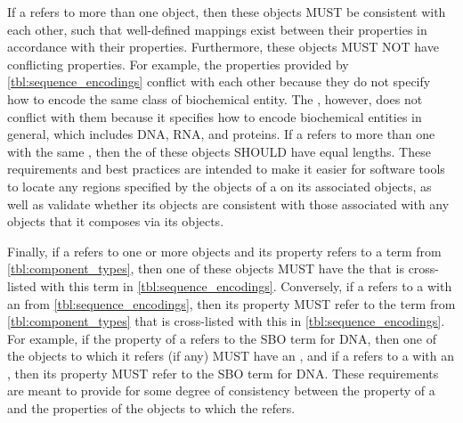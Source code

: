 If a  refers to more than one  object, then these objects MUST be consistent with each other, such that well-defined mappings exist between their  properties in accordance with their  properties. Furthermore, these objects MUST NOT have conflicting  properties. For example, the   properties provided by \ref{tbl:sequence_encodings} conflict with each other because they do not specify how to encode the same class of biochemical entity. The  , however, does not conflict with them because it specifies how to encode biochemical entities in general, which includes DNA, RNA, and proteins. If a  refers to more than one  with the same , then the  of these  objects SHOULD have equal lengths. These requirements and best practices are intended to make it easier for software tools to locate any regions specified by the  objects of a  on its associated  objects, as well as validate whether its  objects are consistent with those associated with any  objects that it composes via its  objects.

Finally, if a  refers to one or more  objects and its  property refers to a term from \ref{tbl:component_types}, then one of these  objects MUST have the  that is cross-listed with this term in \ref{tbl:sequence_encodings}.
Conversely, if a  refers to a  with an  from \ref{tbl:sequence_encodings}, then its  property MUST refer to the term from \ref{tbl:component_types} that is cross-listed with this  in \ref{tbl:sequence_encodings}.
For example, if the  property of a  refers to the SBO term for DNA, then one of the  objects to which it refers (if any) MUST have an  , and if a  refers to a  with an  , then its  property MUST refer to the SBO term for DNA. These requirements are meant to provide for some degree of consistency between the  property of a  and the  properties of the  objects to which the  refers.

